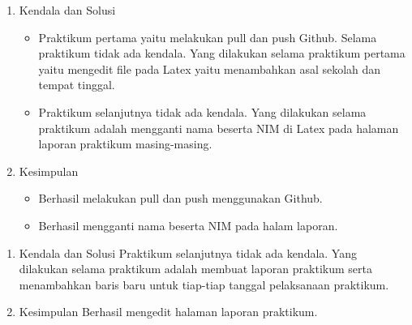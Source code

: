 

\begin{enumerate}
\item Kendala dan Solusi
\begin{itemize}
\item Praktikum pertama yaitu melakukan pull dan push Github. Selama praktikum tidak ada kendala. Yang dilakukan selama praktikum pertama yaitu mengedit file pada Latex yaitu menambahkan asal sekolah dan tempat tinggal.
\item Praktikum selanjutnya tidak ada kendala. Yang dilakukan selama praktikum adalah mengganti nama beserta NIM di Latex pada halaman laporan praktikum masing-masing.
\end{itemize}

\item Kesimpulan
\begin{itemize}
\item Berhasil melakukan pull dan push menggunakan Github. 
\item Berhasil mengganti nama beserta NIM pada halam laporan.
\end{itemize}
\end{enumerate}


\begin{enumerate}
\item Kendala dan Solusi
\newline Praktikum selanjutnya tidak ada kendala. Yang dilakukan selama praktikum adalah membuat laporan praktikum serta menambahkan baris baru untuk tiap-tiap tanggal pelaksanaan praktikum.

\item Kesimpulan
\newline Berhasil mengedit halaman laporan praktikum.
\end{enumerate}


